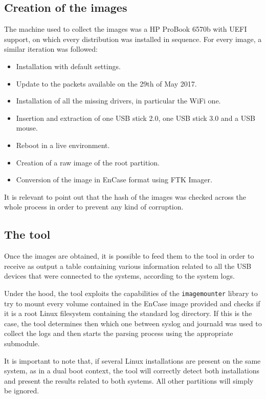 \documentclass[a4paper]{article}
\begin{document}
\subsection{Creation of the images}
\label{sec:images}
The machine used to collect the images was a HP ProBook 6570b with UEFI
support, on which every distribution was installed in sequence. For every
image, a similar iteration was followed:
\begin{itemize}
\item Installation with default settings.
\item Update to the packets available on the 29th of May 2017.
\item Installation of all the missing drivers, in particular the WiFi one.
\item Insertion and extraction of one USB stick 2.0, one USB stick 3.0 and a USB
	mouse.
\item Reboot in a live environment.
\item Creation of a raw image of the root partition.
\item Conversion of the image in EnCase format using FTK Imager.
\end{itemize}
It is relevant to point out that the hash of the images was checked across the
whole process in order to prevent any kind of corruption.

\subsection{The tool}\label{sec:tool}
Once the images are obtained, it is possible to feed them to the tool in order
to receive as output a table containing various information related to all the
USB devices that were connected to the systems, according to the system logs.

Under the hood, the tool exploits the capabilities of the \texttt{imagemounter}
library to try to mount every volume contained in the EnCase image provided and
checks if it is a root Linux filesystem containing the standard log directory.
If this is the case, the tool determines then which one between syslog and
journald was used to collect the logs and then starts the parsing process using
the appropriate submodule.

It is important to note that, if several Linux installations are present on the
same system, as in a dual boot context, the tool will correctly detect both
installations and present the results related to both systems. All other
partitions will simply be ignored.
\end{document}
